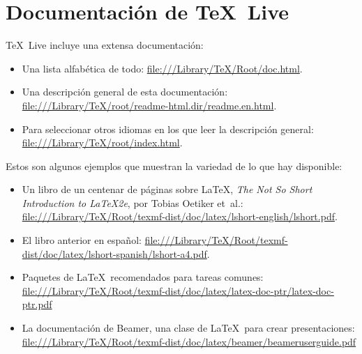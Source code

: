 \documentclass[11pt, oneside]{article}
\begin{document}
\pagestyle{empty}

\vspace*{-1.0cm}
\enlargethispage{2.0cm}

\section{Documentación de \TeX\ Live}

\TeX\ Live incluye una extensa documentación:

\begin{itemize}
\item Una lista alfabética de todo:
\url{file:///Library/TeX/Root/doc.html}.

\item Una descripción general de esta documentación:
\url{file:///Library/TeX/root/readme-html.dir/readme.en.html}.

\item Para seleccionar otros idiomas en los que leer la descripción general:
\url{file:///Library/TeX/root/index.html}.
\end{itemize}

Estos son algunos ejemplos que muestran la variedad de lo que hay disponible:

\begin{itemize}

\item Un libro de un centenar de páginas sobre \LaTeX, \emph {The Not So Short Introduction to
\LaTeX 2e}, por Tobias Oetiker et~al.:
\url{file:///Library/TeX/Root/texmf-dist/doc/latex/lshort-english/lshort.pdf}.

\item El libro anterior en español:
\url{file:///Library/TeX/Root/texmf-dist/doc/latex/lshort-spanish/lshort-a4.pdf}.
     
\item Paquetes de \LaTeX\ recomendados para tareas comunes: 
\url{file:///Library/TeX/Root/texmf-dist/doc/latex/latex-doc-ptr/latex-doc-ptr.pdf}

\item La documentación de Beamer, una clase de \LaTeX\ para crear presentaciones:
\url{file:///Library/TeX/Root/texmf-dist/doc/latex/beamer/beameruserguide.pdf}

\end{itemize}
\end{document}

